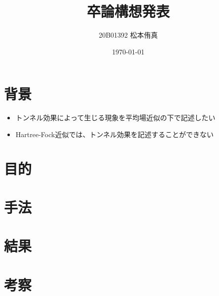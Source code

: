 \documentclass[a4paper,11pt,uplatex]{jsarticle}%
\title{卒論構想発表}
\author{20B01392 松本侑真}
\date{\today}
\begin{document}
\maketitle

\tableofcontents
\newpage

\section{背景}
\begin{itemize}
  \item トンネル効果によって生じる現象を平均場近似の下で記述したい
  \item Hartree-Fock近似では、トンネル効果を記述することができない
\end{itemize}

\section{目的}

\section{手法}

\section{結果}

\section{考察}
\end{document}
